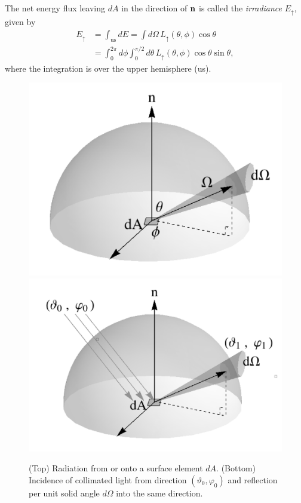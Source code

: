 The net energy flux leaving $dA$ in the direction of ${\bf n}$ is called the \emph{irradiance} $E_{\uparrow}$, given by
\begin{align}
E_{\uparrow} &= \int_{\mathrm{us}} dE = \int  d \Omega \, L_{\uparrow} (\theta,\phi) \cos{\theta} \\
\label{eq:rad}
&= \int_{0}^{2 \pi} d \phi  \int_{0}^{\pi/2} d \theta \, L_{\uparrow} (\theta,\phi) \cos{\theta} \sin{\theta},
\end{align}
where the integration is over the upper hemisphere (us).

\begin{figure}[]
\begin{center}
	\includegraphics[width=\linewidth]{fig/radiance_bw.png}
	\includegraphics[width=\linewidth]{fig/brdfdef_bw.png}
\end{center}
\caption{(Top) Radiation from or onto a surface element $dA$. (Bottom) Incidence of collimated light from direction $(\vartheta_0,\varphi_0)$ and reflection per unit solid angle $d\Omega$ into the same direction.}
\label{fig:int}
\end{figure}

